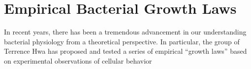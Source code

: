 \section{Empirical Bacterial Growth Laws}

In recent years, there has been a tremendous advancement in our understanding
bacterial physiology from a theoretical perspective. In particular, the group of
Terrence Hwa has proposed and tested a series of empirical ``growth laws'' based
on experimental observations of cellular behavior \cite{Scott2010,Deris2013}

